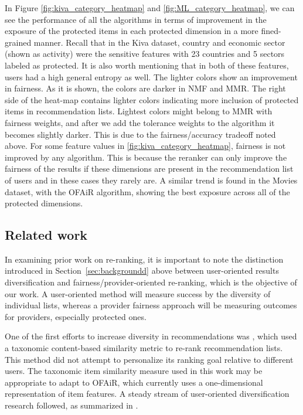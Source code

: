 In Figure \ref{fig:kiva_category_heatmap} and \ref{fig:ML_category_heatmap}, we can see the performance of all the algorithms in terms of improvement in the exposure of the protected items in each protected dimension in a more fined-grained manner. Recall that in the Kiva dataset, country and economic sector (shown as activity) were the sensitive features with 23 countries and 5 sectors labeled as protected. It is also worth mentioning that in both of these features, users had a high general entropy as well. The lighter colors show an improvement in fairness. As it is shown, the colors are darker in NMF and MMR. The right side of the heat-map contains lighter colors indicating more inclusion of protected items in recommendation lists. Lightest colors might belong to MMR with fairness weights, and after we add the tolerance weights to the algorithm it becomes slightly darker. This is due to the fairness/accuracy tradeoff noted above. For some feature values in \ref{fig:kiva_category_heatmap}, fairness is not improved by any algorithm. This is because the reranker can only improve the fairness of the results if these dimensions are present in the recommendation list of users and in these cases they rarely are. A similar trend is found in the Movies dataset, with the OFAiR algorithm, showing the best exposure across all of the protected dimensions. 


\subsection{\textbf{Related work}}
\label{subsec:ofair_related_work}
In examining prior work on re-ranking, it is important to note the distinction introduced in Section~\ref{sec:backgroundd} above between user-oriented results diversification and fairness/provider-oriented re-ranking, which is the objective of our work. A user-oriented method will measure success by the diversity of individual lists, whereas a provider fairness approach will be measuring outcomes for providers, especially protected ones.

One of the first efforts to increase diversity in recommendations was \cite{Ziegler:2005:IRL:1060745.1060754}, which used a taxonomic content-based similarity metric to re-rank recommendation lists. This method did not attempt to personalize its ranking goal relative to different users. The taxonomic item similarity measure used in this work may be appropriate to adapt to OFAiR, which currently uses a one-dimensional representation of item features. A steady stream of user-oriented diversification research followed, as summarized in \cite{kunaver2017diversity}.

